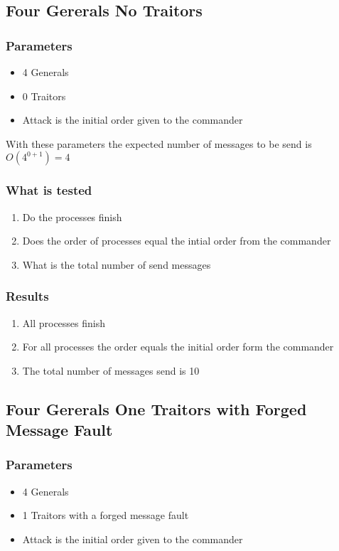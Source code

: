 \documentclass[a4paper, notitlepage]{article}
\begin{document}
\subsection{Four Gererals No Traitors}

\subsubsection*{Parameters}
\begin{itemize}
\item 4 Generals
\item 0 Traitors
\item Attack is the initial order given to the commander
\end{itemize}

With these parameters the expected number of messages to be send is \(O(4^{0+1}) = 4\)

\subsubsection*{What is tested}
\begin{enumerate}
\item Do the processes finish
\item Does the order of processes equal the intial order from the commander
\item What is the total number of send messages
\end{enumerate}

\subsubsection*{Results}
\begin{enumerate}
\item All processes finish
\item For all processes the order equals the initial order form the commander
\item The total number of messages send is 10
\end{enumerate}





\subsection{Four Gererals One Traitors with Forged Message Fault}

\subsubsection*{Parameters}
\begin{itemize}
\item 4 Generals
\item 1 Traitors with a forged message fault
\item Attack is the initial order given to the commander
\end{itemize}
\end{document}
